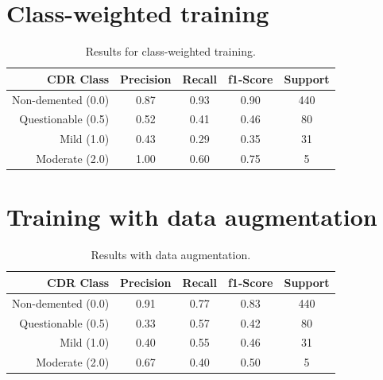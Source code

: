 \documentclass{kththesis}
\begin{document}
\section{Class-weighted training}
\begin{table}[H]
  \begin{center}
    \caption{Results for class-weighted training. \label{tab:results_class_weighted}}
    \begin{tabular}{r|ccc|c}
      \textbf{CDR Class} & \textbf{Precision} & \textbf{Recall} & \textbf{f1-Score} & \textbf{Support} \\
      \toprule
      Non-demented (0.0) & 0.87 & 0.93 & 0.90 & 440 \\
      Questionable (0.5) & 0.52 & 0.41 & 0.46 & 80  \\
      Mild (1.0)         & 0.43 & 0.29 & 0.35 & 31  \\
      Moderate (2.0)     & 1.00 & 0.60 & 0.75 & 5   \\
    \end{tabular}
  \end{center}
\end{table}


\section{Training with data augmentation}
\begin{table}[H]
  \begin{center}
    \caption{Results with data augmentation. \label{tab:results_data_augmentation}}
    \begin{tabular}{r|ccc|c}
      \textbf{CDR Class} & \textbf{Precision} & \textbf{Recall} & \textbf{f1-Score} & \textbf{Support} \\
      \toprule
           Non-demented (0.0) &  0.91   &  0.77  &   0.83   &   440 \\
           Questionable (0.5) &  0.33   &  0.57  &   0.42   &    80 \\
           Mild (1.0)         &  0.40   &  0.55  &   0.46   &    31 \\
           Moderate (2.0)     &  0.67   &  0.40  &   0.50   &     5 \\
    \end{tabular}
  \end{center}
\end{table}
\end{document}
